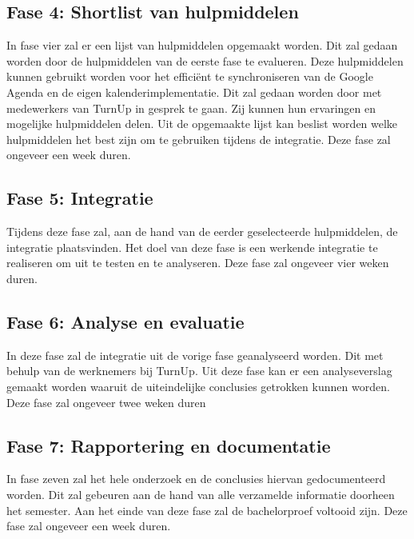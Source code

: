 \subsection{Fase 4: Shortlist van hulpmiddelen}
In fase vier zal er een lijst van hulpmiddelen opgemaakt worden. Dit zal gedaan worden door de hulpmiddelen van de eerste fase te evalueren. Deze hulpmiddelen kunnen gebruikt worden voor het efficiënt te synchroniseren van de Google Agenda en de eigen kalenderimplementatie.
Dit zal gedaan worden door met medewerkers van TurnUp in gesprek te gaan. Zij kunnen hun ervaringen en mogelijke hulpmiddelen delen. Uit de opgemaakte lijst kan beslist worden welke hulpmiddelen het best zijn om te gebruiken tijdens de integratie.
Deze fase zal ongeveer een week duren. 

\subsection{Fase 5: Integratie} 
Tijdens deze fase zal, aan de hand van de eerder geselecteerde hulpmiddelen, de integratie plaatsvinden. 
Het doel van deze fase is een werkende integratie te realiseren om uit te testen en te analyseren.
Deze fase zal ongeveer vier weken duren. 

\subsection{Fase 6: Analyse en evaluatie}
In deze fase zal de integratie uit de vorige fase geanalyseerd worden. Dit met behulp van de werknemers bij TurnUp.
Uit deze fase kan er een analyseverslag gemaakt worden waaruit de uiteindelijke conclusies getrokken kunnen worden.
Deze fase zal ongeveer twee weken duren


\subsection{Fase 7: Rapportering en documentatie}
In fase zeven zal het hele onderzoek en de conclusies hiervan gedocumenteerd worden.
Dit zal gebeuren aan de hand van alle verzamelde informatie doorheen het semester. 
Aan het einde van deze fase zal de bachelorproef voltooid zijn. 
Deze fase zal ongeveer een week duren.

